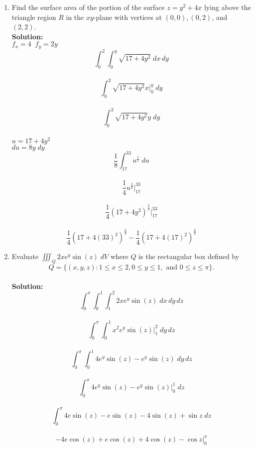 \documentclass[11pt]{article}
\begin{document}
\begin{enumerate}
    
    \item Find the surface area of the portion of the surface $z=y^2+4x$ lying above the triangle region $R$ in the $xy$-plane with vertices at $(0,0), (0, 2)$, and $(2,2)$.
    \\
    \textbf{Solution:}
    \\
    $f_x=4 \; \; f_y=2y$
    \\
    $$ \int_{0}^{2} \int_{0}^{y} \sqrt{17+4y^2} \; dx \, dy $$
    \\
    $$ \int_{0}^{2} \sqrt{17+4y^2} x |_{0}^{y} \;  dy $$
    \\
     $$ \int_{0}^{2} \sqrt{17+4y^2} y \;  dy $$
     \\
     $u=17+4y^2$ \\ $du=8y \; dy$
     \\
     $$\frac{1}{8} \int_{17}^{33} u^{\frac{1}{2}} \; du $$
     \\
     $$\frac{1}{4} u^{\frac{3}{2}} |_{17}^{33}$$
     \\
     $$\frac{1}{4} (17+4y^2)^{\frac{3}{2}} |_{17}^{33}$$
     \\
     $$\frac{1}{4} (17+4(33)^2)^{\frac{3}{2}}-\frac{1}{4} (17+4(17)^2)^{\frac{3}{2}}$$     
     
     
     
     
     
     
    
    \item Evaluate $\iiint_Q 2xe^y \sin(z) \; dV$ where $Q$ is the rectangular box defined by $$Q=\{(x,y,z): 1 \le x \le 2, 0 \le y \le 1, \text{ and } 0 \le z \le \pi \}.$$
    \\
    \textbf{Solution:} \\
    $$\int_{0}^{\pi} \int_{0}^{1} \int_{1}^{2} 2xe^y \sin(z) \; dx \, dy \, dz  $$ \\
    
    $$\int_{0}^{\pi} \int_{0}^{1} x^2e^y \sin(z) |_{1}^{2} \; dy \, dz  $$ \\
    
    $$\int_{0}^{\pi} \int_{0}^{1} 4e^y \sin(z)- e^y \sin(z) \; dy \, dz  $$ \\
    
    $$\int_{0}^{\pi}  4e^y \sin(z)- e^y \sin(z) |_{0}^{1} \; dz  $$ \\
    $$\int_{0}^{\pi}  4e \sin(z)- e \sin(z) - 4 \sin(z) + \sin{z} \; dz  $$ \\
    
     $$  -4e \cos(z) + e \cos(z) + 4 \cos(z)  - \cos{z} |_{0}^{\pi}  $$ \\
     

\end{enumerate}
\end{document}
